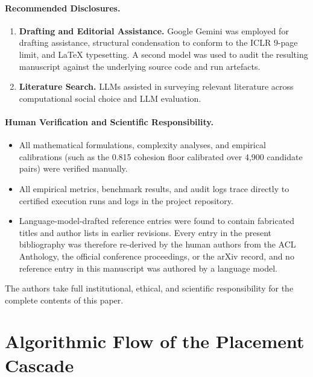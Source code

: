 \documentclass{article}
\begin{document}
\paragraph{Recommended Disclosures.}
\begin{enumerate}
\item \textbf{Drafting and Editorial Assistance.} Google Gemini was employed for drafting assistance, structural condensation to conform to the ICLR 9-page limit, and \LaTeX{} typesetting. A second model was used to audit the resulting manuscript against the underlying source code and run artefacts.
\item \textbf{Literature Search.} LLMs assisted in surveying relevant literature across computational social choice and LLM evaluation.
\end{enumerate}

\paragraph{Human Verification and Scientific Responsibility.}
\begin{itemize}
\item All mathematical formulations, complexity analyses, and empirical calibrations (such as the 0.815 cohesion floor calibrated over 4,900 candidate pairs) were verified manually.
\item All empirical metrics, benchmark results, and audit logs trace directly to certified execution runs and logs in the project repository.
\item Language-model-drafted reference entries were found to contain fabricated titles and author lists in earlier revisions. Every entry in the present bibliography was therefore re-derived by the human authors from the ACL Anthology, the official conference proceedings, or the arXiv record, and no reference entry in this manuscript was authored by a language model.
\end{itemize}
The authors take full institutional, ethical, and scientific responsibility for the complete contents of this paper.




\appendix

\section{Algorithmic Flow of the Placement Cascade}
\end{document}
